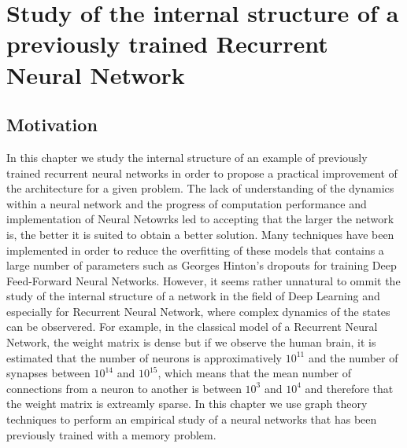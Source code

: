 
\chapter{ Study of the internal structure of a previously trained Recurrent Neural Network} %

\label{Chapter 3} %




\section{Motivation}

In this chapter we study the internal structure of an example of previously trained recurrent neural networks in order to propose a practical improvement of the architecture for a given problem. The lack of understanding of the dynamics within a neural network and the progress of computation performance and implementation of Neural Netowrks led to accepting that the larger the network is, the better it is suited to obtain a better solution. Many techniques have been implemented in order to reduce the overfitting of these models that contains a large number of parameters such as Georges Hinton's dropouts for training Deep Feed-Forward Neural Networks. However, it seems rather unnatural to ommit the study of the internal structure of a network in the field of Deep Learning and especially for Recurrent Neural Network, where complex dynamics of the states can be observered. For example, in the classical model of a Recurrent Neural Network, the weight matrix is dense but if we observe the human brain, it is estimated that the number of neurons is approximatively $10^{11}$ and the number of synapses between $10^{14}$ and $10^{15}$, which means that the mean number of connections from a neuron to another is between $10^3$ and $10^4$ and therefore that the weight matrix is extreamly sparse. In this chapter we use graph theory techniques to perform an empirical study of a neural networks that has been previously trained with a memory problem. 

